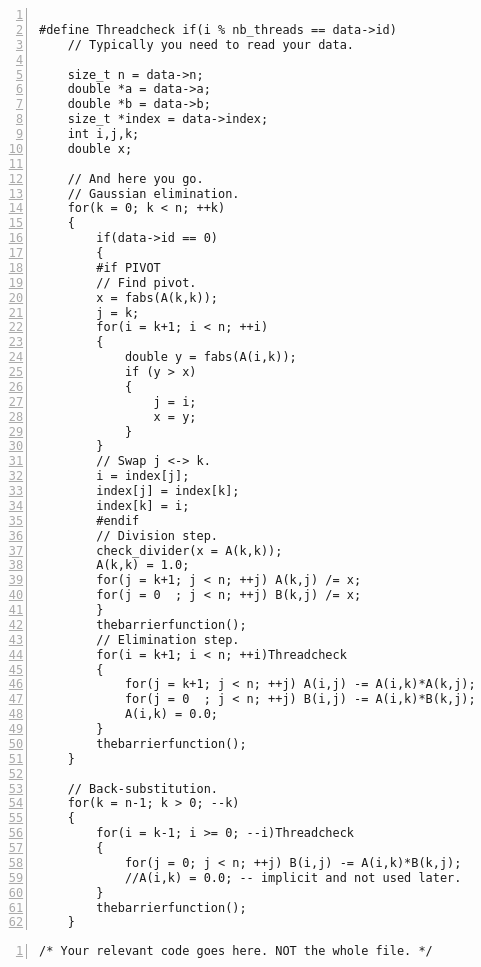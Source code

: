 \documentclass{article}
\begin{document}
\begin{lstlisting}[basicstyle=\small\sffamily,
keywords={break,case,const,continue,default,else,enum,
for,if,return,switch,while,do,long,void,int,float,double,
char,struct,typedef,include,size\_t},
keywordstyle={\color{blue}},
comment={[l]{//}}, morecomment={[s]{/*}{*/}}, commentstyle=\itshape,
columns={[l]flexible}, numbers=left, numberstyle=\tiny,
frameround=fftt, frame=shadowbox, captionpos=b,
caption={Matrix inversion with semaphores.},
label=LST:invmat1]

#define Threadcheck if(i % nb_threads == data->id)
    // Typically you need to read your data.

    size_t n = data->n;
    double *a = data->a;
    double *b = data->b;
    size_t *index = data->index;
    int i,j,k;
    double x;

    // And here you go.
	// Gaussian elimination.
    for(k = 0; k < n; ++k)
    {
		if(data->id == 0)
		{
		#if PIVOT
        // Find pivot.
        x = fabs(A(k,k));
        j = k;
        for(i = k+1; i < n; ++i)
        {
            double y = fabs(A(i,k));
            if (y > x)
            {
                j = i;
                x = y;
            }
        }
        // Swap j <-> k.
        i = index[j];
        index[j] = index[k];
        index[k] = i;
		#endif
        // Division step.
        check_divider(x = A(k,k));
        A(k,k) = 1.0;
        for(j = k+1; j < n; ++j) A(k,j) /= x;
        for(j = 0  ; j < n; ++j) B(k,j) /= x;
		}
		thebarrierfunction();
        // Elimination step.
        for(i = k+1; i < n; ++i)Threadcheck
        {
            for(j = k+1; j < n; ++j) A(i,j) -= A(i,k)*A(k,j);
            for(j = 0  ; j < n; ++j) B(i,j) -= A(i,k)*B(k,j);
            A(i,k) = 0.0;
        }
		thebarrierfunction();
    }

    // Back-substitution.
    for(k = n-1; k > 0; --k)
    {
        for(i = k-1; i >= 0; --i)Threadcheck
        {
            for(j = 0; j < n; ++j) B(i,j) -= A(i,k)*B(k,j);
            //A(i,k) = 0.0; -- implicit and not used later.
        }
		thebarrierfunction();
    }
\end{lstlisting}

\begin{lstlisting}[basicstyle=\small\sffamily,
keywords={break,case,const,continue,default,else,enum,
for,if,return,switch,while,do,long,void,int,float,double,
char,struct,typedef,include,size\_t},
keywordstyle={\color{blue}},
comment={[l]{//}}, morecomment={[s]{/*}{*/}}, commentstyle=\itshape,
columns={[l]flexible}, numbers=left, numberstyle=\tiny,
frameround=fftt, frame=shadowbox, captionpos=b,
caption={Matrix inversion with barriers.},
label=LST:invmat2]
/* Your relevant code goes here. NOT the whole file. */
\end{lstlisting}
\end{document}
